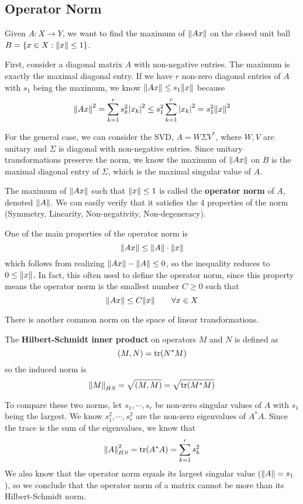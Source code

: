\subsection{Operator Norm}

Given $A: X \rightarrow Y$, we want to find the maximum of $\norm{Ax}$ on the closed unit ball $B = \{ x \in X : \norm{x} \leq 1 \}$. 

First, consider a diagonal matrix $A$ with non-negative entries. The maximum is exactly the maximal diagonal entry. If we have $r$ non-zero diagonal entries of $A$ with $s_{1}$ being the maximum, we know $\norm{Ax} \leq s_{1} \norm{x}$ because 
$$\norm{Ax}^{2} = \sum_{k=1}^{r} s_{k}^{2} \abs{x_{k}}^{2} \leq s_{1}^{2} \sum_{k=1}^{r} \abs{x_{k}}^{2} = s_{1}^{2} \norm{x}^{2}$$

For the general case, we can consider the SVD, $A = W \Sigma V^{*}$, where $W, V$ are unitary and $\Sigma$ is diagonal with non-negative entries. Since unitary transformations preserve the norm, we know the maximum of $\norm{Ax}$ on $B$ is the maximal diagonal entry of $\Sigma$, which is the maximal singular value of $A$. 

\begin{definition}
The maximum of $\norm{Ax}$ such that $\norm{x} \leq 1$ is called the \textbf{operator norm} of $A$, denoted $\norm{A}$. We can easily verify that it satisfies the 4 properties of the norm (Symmetry, Linearity, Non-negativity, Non-degeneracy). 

One of the main properties of the operator norm is 
$$\norm{Ax} \leq \norm{A} \cdot \norm{x}$$
which follows from realizing $\norm{Ax} - \norm{A} \leq 0$, so the inequality reduces to $0 \leq \norm{x}$. In fact, this often used to define the operator norm, since this property means the operator norm is the smallest number $C \geq 0$ such that 
$$\norm{Ax} \leq C \norm{x} \qquad \forall x \in X$$
\end{definition}

There is another common norm on the space of linear transformations. 

\begin{definition}
The \textbf{Hilbert-Schmidt inner product} on operators $M$ and $N$ is defined as 
$$ (M, N) = \operatorname{tr}(N^{*}M)$$
so the induced norm is 
$$\norm{M}_{HS} = \sqrt{(M, M)} = \sqrt{\operatorname{tr}(M^{*}M)}$$
\end{definition}

To compare these two norms, let $s_{1}, \cdots, s_{r}$ be non-zero singular values of $A$ with $s_{1}$ being the largest. We know $s_{1}^{2}, \cdots, s_{r}^{2}$ are the non-zero eigenvalues of $A^{*} A$. Since the trace is the sum of the eigenvalues, we know that 
$$\norm{A}_{HS}^{2} = \operatorname{tr}(A^{*}A) = \sum_{k=1}^{r} s_{k}^{2}$$
We also know that the operator norm equals its largest singular value ($\norm{A} = s_{1}$), so we conclude that the operator norm of a matrix cannot be more than its Hilbert-Schmidt norm. 

